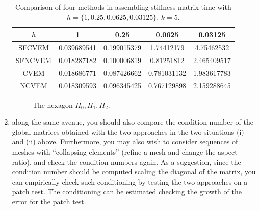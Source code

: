 \documentclass[10pt]{amsart}
\theoremstyle{definition}
\theoremstyle{remark}
\begin{document}
\begin{enumerate}[1.]
\begin{table}[htbp]
\caption{Comparison of four methods in assembling stiffness matrix time with
 $h=\{1, 0.25, 0.0625, 0.03125\}$, $k = 5$.}
\label{tab:ttime}
\begin{tabular}{c|cccc}
\toprule
$h$ &    1	& 0.25 & 0.0625 & 0.03125\\
\hline
SFCVEM & 0.039689541 & 0.199015379	& 1.74412179	& 4.75462532\\
SFNCVEM & 0.018287182 & 0.100006819	& 0.81251812	& 2.465409517\\
CVEM & 0.018686771 & 0.087426662	& 0.781031132	& 1.983617783\\
NCVEM & 0.018309593 & 0.096345425	& 0.767129898	& 2.159288645\\
\bottomrule
\end{tabular}
\end{table}

\begin{figure}[h]
\centering
{}
\caption{The hexagon $H_0, H_1, H_2$.}
  \label{fig:collapsehexagon} %
\end{figure} 

\item \textsf{
along the same avenue, you should also compare the condition number of the
global matrices obtained with the two approaches in the two situations (i) and
(ii) above. Furthermore, you may also wish to consider sequences of meshes with
“collapsing elements” (refine a mesh and change the aspect ratio), and check the
condition numbers again.  As a suggestion, since the condition number should be
computed scaling the diagonal of the matrix, you can empirically check such
conditioning by testing the two approaches on a patch test. The conditioning can
be estimated checking the growth of the error for the patch test.
}


\end{enumerate}
\end{document}

